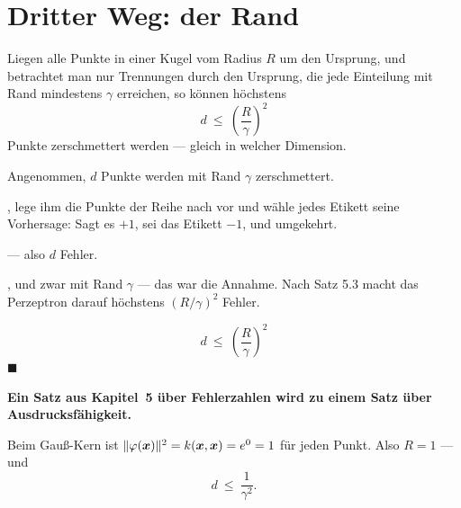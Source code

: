 \section{Dritter Weg: der Rand}

\begin{merksatz}
Liegen alle Punkte in einer Kugel vom Radius $R$ um den Ursprung, und betrachtet man nur Trennungen durch den Ursprung, die jede Einteilung mit Rand mindestens $\gamma$ erreichen, so können höchstens
\[ d \ \le\ \left(\frac{R}{\gamma}\right)^{2} \]
Punkte zerschmettert werden --- \textcolor{akzent}{gleich in welcher Dimension}.

Angenommen, $d$ Punkte werden mit Rand $\gamma$ zerschmettert.

, lege ihm die Punkte der Reihe nach vor und wähle jedes Etikett  seine Vorhersage: Sagt es $+1$, sei das Etikett $-1$, und umgekehrt.

 --- also $d$ Fehler.

, und zwar mit Rand $\gamma$ --- das war die Annahme. Nach Satz 5.3 macht das Perzeptron darauf höchstens $(R/\gamma)^{2}$ Fehler.

\[ d \ \le\ \left(\frac{R}{\gamma}\right)^{2} \]
$\blacksquare$

\begin{center}
\begin{minipage}{0.9\textwidth}
\textbf{Ein Satz aus Kapitel~5 über Fehlerzahlen wird zu einem Satz über Ausdrucksfähigkeit.}
\end{minipage}
\end{center}

Beim Gauß-Kern ist $\|\varphi(\boldsymbol{x})\|^{2} = k(\boldsymbol{x},\boldsymbol{x}) = e^{0} = 1$ für jeden Punkt. Also $R = 1$ --- und
\[ d \ \le\ \frac{1}{\gamma^{2}} . \]

\begin{center}
\begin{minipage}{0.88\textwidth}
\end{minipage}
\end{center}


\end{merksatz}
